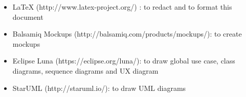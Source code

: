 \begin{itemize}
	\item LaTeX (http://www.latex-project.org/) : to redact and to format this document
	\item Balsamiq Mockups (http://balsamiq.com/products/mockups/): to create mockups
	\item Eclipse Luna (https://eclipse.org/luna/): to draw global use case, class diagrams, sequence diagrams and UX diagram
	\item StarUML (http://staruml.io/): to draw UML diagrams
\end{itemize}